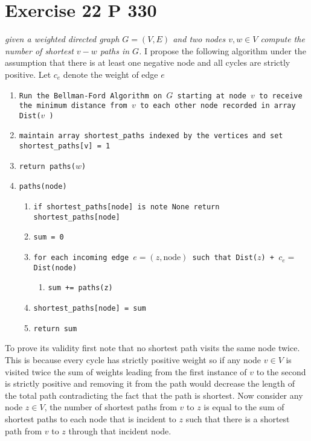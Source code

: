\documentclass{amsart}
\begin{document}
\section{Exercise 22 P 330}
\emph{
    given a weighted directed graph $G = (V,E)$ and two nodes $v,w \in V$ compute the number
    of shortest $v-w$ paths in $G$.
}
I propose the following algorithm under the assumption that there is at least one negative node and all cycles are strictly positive. Let $c_e$ denote the weight of edge $e$
{\small
    \begin{enumerate}
        \item \texttt{Run the Bellman-Ford Algorithm on $G$ starting at node $v$ to receive the
            minimum distance from  $v$ to each other node recorded in array Dist($v$ )}
        \item \texttt{maintain array shortest\_paths indexed by the vertices and set shortest\_paths[v] = 1}
        \item \texttt{return paths($w$)}
        \item \texttt{paths(node)}
            \begin{enumerate}
                \item \texttt{if shortest\_paths[node] is note None return shortest\_paths[node]}
                \item \texttt{sum = 0}
                \item \texttt{for each incoming edge $e = (z,\text{node})$ such that Dist($z$) + $c_e = $ Dist(node)}
                    \begin{enumerate}
                        \item \texttt{sum += paths(z)}
                    \end{enumerate}
                \item \texttt{shortest\_paths[node] = sum}
                \item \texttt{return sum}
            \end{enumerate}
    \end{enumerate}
}
To prove its validity first note that no shortest path visits the same node twice. This is because every cycle has strictly positive weight so if any node $v \in V$ is visited twice
the sum of weights leading from the first instance of $v$ to the second is strictly positive and removing it from the path would decrease the length of the total path contradicting the fact 
that the path is shortest.
Now consider any node $z \in V$, the number of shortest paths from $v$ to $z$ is equal to the sum of shortest paths to each node that is incident to $z$ such that there is a shortest path from $v$ to $z$ through that incident node.
\end{document}
